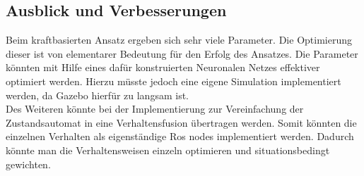 \documentclass[
a4paper,     %
12pt         %
]{scrartcl}  %
\begin{document}
\subsection{Ausblick und Verbesserungen}
Beim kraftbasierten Ansatz ergeben sich sehr viele Parameter. Die Optimierung dieser ist von elementarer Bedeutung für den Erfolg des Ansatzes.
Die Parameter könnten mit Hilfe eines dafür konstruierten Neuronalen Netzes effektiver optimiert werden. Hierzu müsste jedoch eine eigene Simulation implementiert werden, da Gazebo hierfür zu langsam ist.\\
Des Weiteren könnte bei der Implementierung  zur Vereinfachung der Zustandsautomat in eine Verhaltensfusion übertragen werden. Somit könnten die einzelnen Verhalten als eigenständige Ros nodes implementiert werden. Dadurch könnte man die Verhaltensweisen einzeln optimieren und situationsbedingt gewichten.
% 
% 
\end{document}
